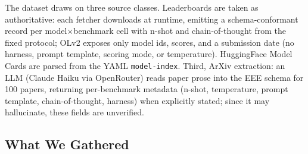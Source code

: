 \documentclass[11pt]{article}
\begin{document}
%
%
The dataset draws on three source classes. Leaderboards are taken as
authoritative: each fetcher downloads at runtime, emitting a schema-conformant
record per model$\times$benchmark cell with n-shot and chain-of-thought from the
fixed protocol; OLv2 exposes only model ids, scores, and a submission date (no
harness, prompt template, scoring mode, or temperature). HuggingFace Model Cards
are parsed from the YAML \texttt{model-index}. Third, ArXiv extraction: an LLM
(Claude Haiku via OpenRouter) reads paper prose into the EEE schema for 100
papers, returning per-benchmark metadata (n-shot, temperature, prompt template,
chain-of-thought, harness) when explicitly stated; since it may hallucinate, these
fields are unverified.


\subsection{What We Gathered}
\label{sec:dataset}
\end{document}

